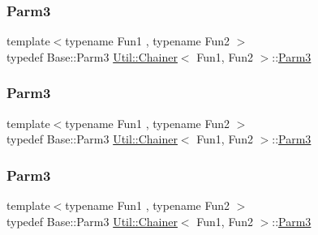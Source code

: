 \mbox{\label{classUtil_1_1Chainer_ac28811d7153f7b7cf837f7b8626436c8}} 
\subsubsection{\texorpdfstring{Parm3}{Parm3}\hspace{0.1cm}{\footnotesize\ttfamily [1/3]}}
{\footnotesize\ttfamily template$<$typename Fun1 , typename Fun2 $>$ \\
typedef Base\+::\+Parm3 \mbox{\hyperlink{classUtil_1_1Chainer}{Util\+::\+Chainer}}$<$ Fun1, Fun2 $>$\+::\mbox{\hyperlink{classUtil_1_1Chainer_ac28811d7153f7b7cf837f7b8626436c8}{Parm3}}}

\mbox{\label{classUtil_1_1Chainer_ac28811d7153f7b7cf837f7b8626436c8}} 
\subsubsection{\texorpdfstring{Parm3}{Parm3}\hspace{0.1cm}{\footnotesize\ttfamily [2/3]}}
{\footnotesize\ttfamily template$<$typename Fun1 , typename Fun2 $>$ \\
typedef Base\+::\+Parm3 \mbox{\hyperlink{classUtil_1_1Chainer}{Util\+::\+Chainer}}$<$ Fun1, Fun2 $>$\+::\mbox{\hyperlink{classUtil_1_1Chainer_ac28811d7153f7b7cf837f7b8626436c8}{Parm3}}}

\mbox{\label{classUtil_1_1Chainer_ac28811d7153f7b7cf837f7b8626436c8}} 
\subsubsection{\texorpdfstring{Parm3}{Parm3}\hspace{0.1cm}{\footnotesize\ttfamily [3/3]}}
{\footnotesize\ttfamily template$<$typename Fun1 , typename Fun2 $>$ \\
typedef Base\+::\+Parm3 \mbox{\hyperlink{classUtil_1_1Chainer}{Util\+::\+Chainer}}$<$ Fun1, Fun2 $>$\+::\mbox{\hyperlink{classUtil_1_1Chainer_ac28811d7153f7b7cf837f7b8626436c8}{Parm3}}}

